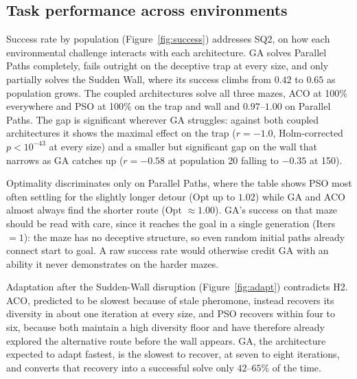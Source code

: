 \documentclass[11pt,a4paper]{article}
\begin{document}
    \subsection{Task performance across environments}
    Success rate by population (Figure~\ref{fig:success}) addresses SQ2, on how each environmental challenge interacts with each architecture. GA solves Parallel Paths completely, fails outright on the deceptive trap at every size, and only partially solves the Sudden Wall, where its success climbs from $0.42$ to $0.65$ as population grows. The coupled architectures solve all three mazes, ACO at 100\% everywhere and PSO at 100\% on the trap and wall and $0.97$--$1.00$ on Parallel Paths. The gap is significant wherever GA struggles: against both coupled architectures it shows the maximal effect on the trap ($r = -1.0$, Holm-corrected $p < 10^{-43}$ at every size) and a smaller but significant gap on the wall that narrows as GA catches up ($r = -0.58$ at population 20 falling to $-0.35$ at 150).

    Optimality discriminates only on Parallel Paths, where the table shows PSO most often settling for the slightly longer detour (Opt up to $1.02$) while GA and ACO almost always find the shorter route (Opt $\approx 1.00$). GA's success on that maze should be read with care, since it reaches the goal in a single generation (Iters $=1$): the maze has no deceptive structure, so even random initial paths already connect start to goal. A raw success rate would otherwise credit GA with an ability it never demonstrates on the harder mazes.

    Adaptation after the Sudden-Wall disruption (Figure~\ref{fig:adapt}) contradicts H2. ACO, predicted to be slowest because of stale pheromone, instead recovers its diversity in about one iteration at every size, and PSO recovers within four to six, because both maintain a high diversity floor and have therefore already explored the alternative route before the wall appears. GA, the architecture expected to adapt fastest, is the slowest to recover, at seven to eight iterations, and converts that recovery into a successful solve only $42$--$65\%$ of the time.
\end{document}
